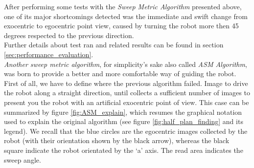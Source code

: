 After performing some tests with the \textit{Sweep Metric
Algorithm} presented above, one of its major shortcomings
detected was the immediate and swift change from exocentric
to egocentric point view, caused by turning the robot
more then 45 degrees respected to the previous direction.
\\
Further details about test ran and related results can be
found in section \ref{sec:performance_evaluation}.
\\
\textit{Another sweep metric algorithm}, for simplicity's
sake also called \textit{ASM Algorithm}, was born to provide
a better and more comfortable way of guiding the robot.
\\
First of all, we have to define where the previous algorithm
failed. Image to drive the robot along a straight direction,
until \framework{} collects a sufficient number of images to
present you the robot with an artificial exocentric point of
view. This case can be summarized by figure \ref{fig:ASM_explain},
which resumes the graphical notation
used to explain the original algorithm (see figure
\ref{fig:half_plan_finding} and its legend). We recall
that the blue circles are the egocentric images collected
by the robot (with their orientation shown by the black
arrow), whereas the black square indicate the robot orientated
by the `a' axis. The read area indicates the sweep angle.
